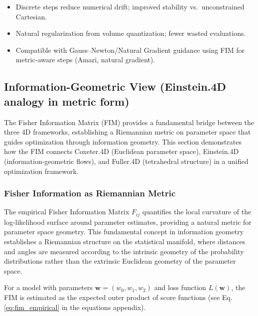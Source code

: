 \documentclass[
  10pt,
]{article}
\providecommand{\tightlist}{%
  \setlength{\itemsep}{0pt}\setlength{\parskip}{0pt}}
\begin{document}
\begin{itemize}
\tightlist
\item
  Discrete steps reduce numerical drift; improved stability
  vs.~unconstrained Cartesian.
\item
  Natural regularization from volume quantization; fewer wasted
  evaluations.
\item
  Compatible with Gauss--Newton/Natural Gradient guidance using FIM for
  metric-aware steps (Amari, natural gradient).
\end{itemize}

\hypertarget{information-geometric-view-einstein.4d-analogy-in-metric-form}{%
\subsection{Information-Geometric View (Einstein.4D analogy in metric
form)}\label{information-geometric-view-einstein.4d-analogy-in-metric-form}}

The Fisher Information Matrix (FIM) provides a fundamental bridge
between the three 4D frameworks, establishing a Riemannian metric on
parameter space that guides optimization through information geometry.
This section demonstrates how the FIM connects Coxeter.4D (Euclidean
parameter space), Einstein.4D (information-geometric flows), and
Fuller.4D (tetrahedral structure) in a unified optimization framework.

\hypertarget{fisher-information-as-riemannian-metric}{%
\subsubsection{Fisher Information as Riemannian
Metric}\label{fisher-information-as-riemannian-metric}}

The empirical Fisher Information Matrix \(F_{ij}\) quantifies the local
curvature of the log-likelihood surface around parameter estimates,
providing a natural metric for parameter space geometry. This
fundamental concept in information geometry establishes a Riemannian
structure on the statistical manifold, where distances and angles are
measured according to the intrinsic geometry of the probability
distributions rather than the extrinsic Euclidean geometry of the
parameter space.

For a model with parameters \(\mathbf{w} = (w_0, w_1, w_2)\) and loss
function \(L(\mathbf{w})\), the FIM is estimated as the expected outer
product of score functions (see Eq. \eqref{eq:fim_empirical} in the
equations appendix).
\end{document}
